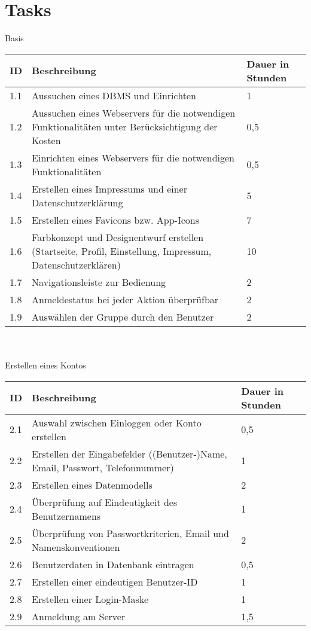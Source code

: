 \section*{Tasks}
Basis\\
\begin{tabular}[h]{|p{1cm}|p{10cm}|p{3cm}|}
\hline 
ID & Beschreibung & Dauer in Stunden \\ \hline 
1.1 & Aussuchen eines DBMS und Einrichten & 1 \\ \hline 
1.2 & Aussuchen eines Webservers für die notwendigen Funktionalitäten unter Berücksichtigung der Kosten & 0,5\\ \hline 
1.3 & Einrichten eines Webservers für die notwendigen Funktionalitäten & 0,5\\ \hline 
1.4 & Erstellen eines Impressums und einer Datenschutzerklärung & 5\\ \hline 
1.5 & Erstellen eines Favicons bzw. App-Icons & 7\\ \hline 
1.6 & Farbkonzept und Designentwurf erstellen (Startseite, Profil, Einstellung, Impressum, Datenschutzerklären) & 10\\ \hline 
1.7 & Navigationsleiste zur Bedienung & 2\\ \hline 
1.8 & Anmeldestatus bei jeder Aktion überprüfbar & 2\\ \hline 
1.9 & Auswählen der Gruppe durch den Benutzer & 2\\ \hline 
\end{tabular} \\ \\
Erstellen eines Kontos\\
\begin{tabular}[h]{|p{1cm}|p{10cm}|p{3cm}|}
\hline 
ID & Beschreibung & Dauer in Stunden \\ \hline 
2.1 & Auswahl zwischen Einloggen oder Konto erstellen & 0,5\\ \hline
2.2 & Erstellen der Eingabefelder ((Benutzer-)Name, Email, Passwort, Telefonnummer) & 1\\ \hline
2.3 & Erstellen eines Datenmodells & 2\\ \hline
2.4 & Überprüfung auf Eindeutigkeit des Benutzernamens & 1\\\hline
2.5 & Überprüfung von Passwortkriterien, Email und Namenskonventionen & 2\\\hline
2.6 & Benutzerdaten in Datenbank eintragen & 0,5 \\\hline
2.7 & Erstellen einer eindeutigen Benutzer-ID & 1\\\hline
2.8 & Erstellen einer Login-Maske & 1 \\\hline
2.9 & Anmeldung am Server & 1,5 \\\hline
\end{tabular}\newpage
